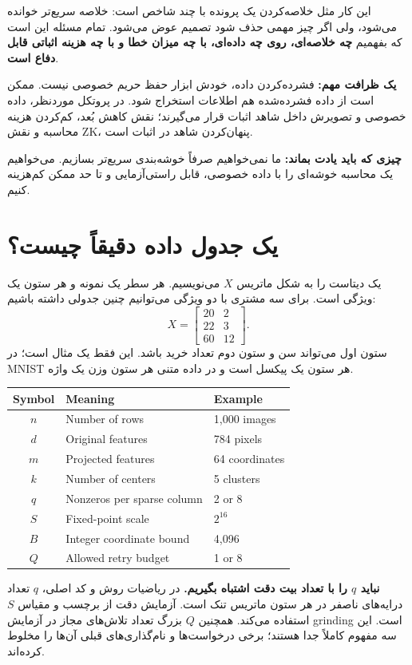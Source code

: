 \documentclass[11pt,a4paper]{article}
\newcommand{\lesson}[1]{\clearpage\section{#1}}
\newcommand{\takeaway}[1]{\par\textbf{چیزی که باید یادت بماند:} #1\par}
\begin{document}
این کار مثل خلاصه‌کردن یک پرونده با چند شاخص است: خلاصه سریع‌تر خوانده می‌شود، ولی اگر چیز مهمی حذف شود تصمیم عوض می‌شود. تمام مسئله این است که بفهمیم \textbf{چه خلاصه‌ای، روی چه داده‌ای، با چه میزان خطا و با چه هزینه اثباتی قابل دفاع است}.

\textbf{یک ظرافت مهم:} فشرده‌کردن داده، خودش ابزار حفظ حریم خصوصی نیست. ممکن است از داده فشرده‌شده هم اطلاعات استخراج شود. در پروتکل موردنظر، داده خصوصی و تصویرش داخل شاهد اثبات قرار می‌گیرند؛ نقش کاهش بُعد، کم‌کردن هزینه محاسبه و نقش ZK، پنهان‌کردن شاهد در اثبات است.

\takeaway{ما نمی‌خواهیم صرفاً خوشه‌بندی سریع‌تر بسازیم. می‌خواهیم یک محاسبه خوشه‌ای را با داده خصوصی، قابل راستی‌آزمایی و تا حد ممکن کم‌هزینه کنیم.}

\lesson{یک جدول داده دقیقاً چیست؟}
یک دیتاست را به شکل ماتریس \(X\) می‌نویسیم. هر سطر یک نمونه و هر ستون یک ویژگی است. برای سه مشتری با دو ویژگی می‌توانیم چنین جدولی داشته باشیم:
\[
 X=\begin{bmatrix}20&2\\22&3\\60&12\end{bmatrix}.
\]
ستون اول می‌تواند سن و ستون دوم تعداد خرید باشد. این فقط یک مثال است؛ در MNIST هر ستون یک پیکسل است و در داده متنی هر ستون وزن یک واژه.

\begin{latin}
\begin{center}\begin{tabular}{cll}
\toprule Symbol & Meaning & Example \\\midrule
\(n\) & Number of rows & 1,000 images \\
\(d\) & Original features & 784 pixels \\
\(m\) & Projected features & 64 coordinates \\
\(k\) & Number of centers & 5 clusters \\
\(q\) & Nonzeros per sparse column & 2 or 8 \\
\(S\) & Fixed-point scale & \(2^{16}\) \\
\(B\) & Integer coordinate bound & 4,096 \\
\(Q\) & Allowed retry budget & 1 or 8 \\
\bottomrule\end{tabular}\end{center}
\end{latin}

\textbf{نباید \(q\) را با تعداد بیت دقت اشتباه بگیریم.} در ریاضیات روش و کد اصلی، \(q\) تعداد درایه‌های ناصفر در هر ستون ماتریس تنک است. آزمایش دقت از برچسب  و مقیاس \(S\) استفاده می‌کند. همچنین \(Q\) بزرگ تعداد تلاش‌های مجاز در آزمایش grinding است. این سه مفهوم کاملاً جدا هستند؛ برخی درخواست‌ها و نام‌گذاری‌های قبلی آن‌ها را مخلوط کرده‌اند.
\end{document}
